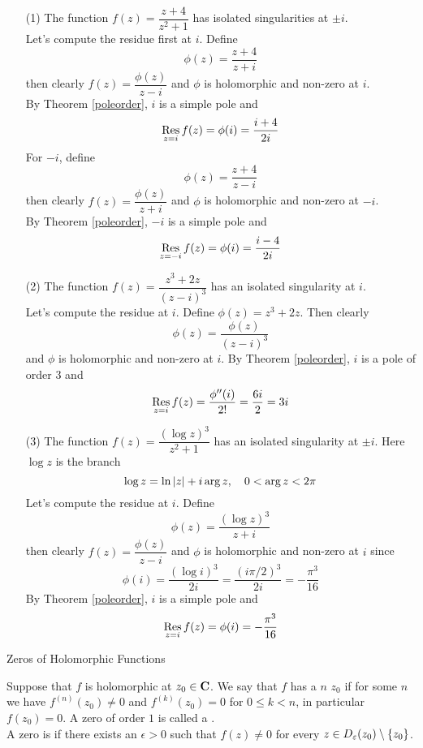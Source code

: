 \vspace*{1em}

\begin{example}\hfill
\begin{itemize}[itemsep=1em]
\item[(1)] The function $f(z) = \dfrac{z + 4}{z^2 + 1}$ has isolated singularities at $\pm i$.\\[0.5em]
Let's compute the residue first at $i$. Define
\[\phi(z) = \frac{z + 4}{z + i}\]
then clearly $f(z) = \dfrac{\phi(z)}{z - i}$ and $\phi$ is holomorphic and non-zero at $i$.\\[0.5em]
By Theorem \ref{poleorder}, $i$ is a simple pole and
\[\underset{z = {i}}{\operatorname{Res}}\,f(z) = \phi(i) = \frac{i + 4}{2i}\]
For $-i$, define \[\phi(z) = \frac{z + 4}{z - i}\]
then clearly $f(z) = \dfrac{\phi(z)}{z + i}$ and $\phi$ is holomorphic and non-zero at $-i$.\\[0.5em]
By Theorem \ref{poleorder}, $-i$ is a simple pole and
\[\underset{z = {-i}}{\operatorname{Res}}\,f(z) = \phi(i) = \frac{i - 4}{2i}\]

\item[(2)] The function $f(z) = \dfrac{z^3 + 2z}{(z - i)^3}$ has an isolated singularity at $i$.\\[0.5em]
Let's compute the residue at $i$. Define $\phi(z) = z^3 + 2z$. Then clearly
\[\phi(z) = \frac{\phi(z)}{(z - i)^3}\]
and $\phi$ is holomorphic and non-zero at $i$. By Theorem \ref{poleorder}, $i$ is a pole of order $3$ and
\[\underset{z = {i}}{\operatorname{Res}}\,f(z) = \frac{\phi''(i)}{2!} = \frac{6i}{2} = 3i\]

\item[(3)] The function $f(z) = \dfrac{(\log z)^3}{z^2 + 1}$ has an isolated singularity at $\pm i$. Here $\log z$ is the branch
\[\log z = \ln\left\lvert z\right\rvert + i\arg z, \quad 0 < \arg z < 2\pi\]
Let's compute the residue at $i$. Define
\[\phi(z) = \frac{(\log z)^3}{z + i}\]
then clearly $f(z) = \dfrac{\phi(z)}{z - i}$ and $\phi$ is holomorphic and non-zero at $i$ since
\[\phi(i) = \frac{(\log i)^3}{2i} = \frac{(i\pi/2)^3}{2i} = -\frac{\pi^3}{16}\]
By Theorem \ref{poleorder}, $i$ is a simple pole and
\[\underset{z = {i}}{\operatorname{Res}}\,f(z) = \phi(i) = -\frac{\pi^3}{16}\]
\end{itemize}
\end{example}

\vspace*{2em}

\begin{mdframed}
\begin{center}
{\Large Zeros of Holomorphic Functions}
\end{center}
\end{mdframed}
\begin{definition}
Suppose that $f$ is holomorphic at $z_0 \in \mathbf C$. We say that $f$ has a  {\color{blue}$n$}  {\color{blue}$z_0$} if for some $n$ we have $f^{(n)}(z_0) \neq 0$ and $f^{(k)}(z_0) = 0$ for $0 \leq k < n$, in particular $f(z_0) = 0$. A zero of order $1$ is called a .\\[0.5em]
A zero is  if there exists an $\epsilon > 0$ such that $f(z) \neq 0$ for every $z \in D_\varepsilon(z_0)\setminus\left\{z_0\right\}$.
\end{definition}

